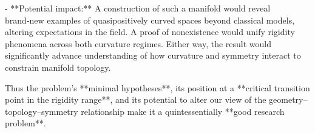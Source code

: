 - **Potential impact:**  
  A construction of such a manifold would reveal brand‑new examples of quasipositively curved spaces beyond classical models, altering expectations in the field. A proof of nonexistence would unify rigidity phenomena across both curvature regimes. Either way, the result would significantly advance understanding of how curvature and symmetry interact to constrain manifold topology.  

Thus the problem’s **minimal hypotheses**, its position at a **critical transition point in the rigidity range**, and its potential to alter our view of the geometry–topology–symmetry relationship make it a quintessentially **good research problem**.